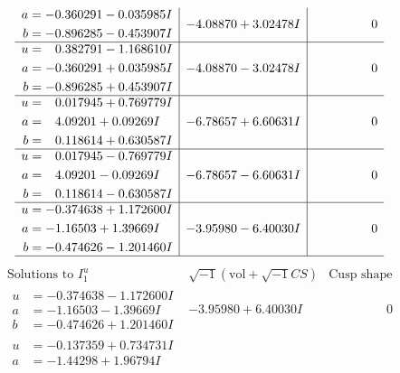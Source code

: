 \documentclass[1p]{elsarticle_modified}
\theoremstyle{definition}
\newcommand{\I}{\sqrt{-1}}
\begin{document}
$$\begin{array}{c|c|c}
\begin{aligned}
a &= -0.360291 - 0.035985 I \\
b &= -0.896285 - 0.453907 I\end{aligned}
 & -4.08870 + 3.02478 I & \phantom{-0.000000 } 0 \\ \hline\begin{aligned}
u &= \phantom{-}0.382791 - 1.168610 I \\
a &= -0.360291 + 0.035985 I \\
b &= -0.896285 + 0.453907 I\end{aligned}
 & -4.08870 - 3.02478 I & \phantom{-0.000000 } 0 \\ \hline\begin{aligned}
u &= \phantom{-}0.017945 + 0.769779 I \\
a &= \phantom{-}4.09201 + 0.09269 I \\
b &= \phantom{-}0.118614 + 0.630587 I\end{aligned}
 & -6.78657 + 6.60631 I & \phantom{-0.000000 } 0 \\ \hline\begin{aligned}
u &= \phantom{-}0.017945 - 0.769779 I \\
a &= \phantom{-}4.09201 - 0.09269 I \\
b &= \phantom{-}0.118614 - 0.630587 I\end{aligned}
 & -6.78657 - 6.60631 I & \phantom{-0.000000 } 0 \\ \hline\begin{aligned}
u &= -0.374638 + 1.172600 I \\
a &= -1.16503 + 1.39669 I \\
b &= -0.474626 - 1.201460 I\end{aligned}
 & -3.95980 - 6.40030 I & \phantom{-0.000000 } 0\\
 \hline 
 \end{array}$$\newpage$$\begin{array}{c|c|c}  
\text{Solutions to }I^u_{1}& \I (\text{vol} + \sqrt{-1}CS) & \text{Cusp shape}\\
 \hline 
\begin{aligned}
u &= -0.374638 - 1.172600 I \\
a &= -1.16503 - 1.39669 I \\
b &= -0.474626 + 1.201460 I\end{aligned}
 & -3.95980 + 6.40030 I & \phantom{-0.000000 } 0 \\ \hline\begin{aligned}
u &= -0.137359 + 0.734731 I \\
a &= -1.44298 + 1.96794 I \\

\end{aligned}
\end{array}$$
\end{document}
